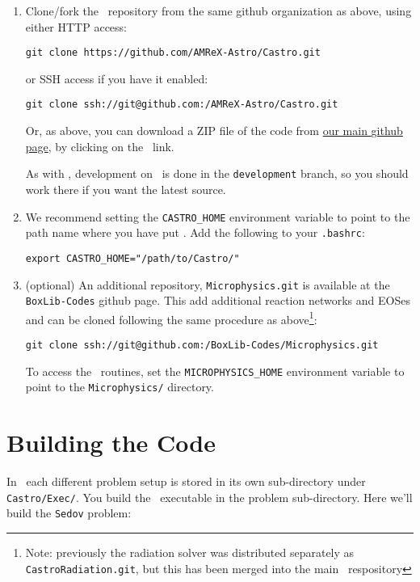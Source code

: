 \begin{enumerate}
\item Clone/fork the \castro\ repository from the same {\sf
  github} organization as above, using either HTTP access:
\begin{verbatim}
git clone https://github.com/AMReX-Astro/Castro.git
\end{verbatim}
or SSH access if you have it enabled:
\begin{verbatim}
git clone ssh://git@github.com:/AMReX-Astro/Castro.git
\end{verbatim}
Or, as above, you can download a ZIP file of the code from
\href{https://github.com/AMReX-Astro}{our main {\sf github} page},
by clicking on the \castro\ link.

As with \amrex, development on \castro\ is done in the
{\tt development} branch, so you should work there if you want
the latest source.

\item We recommend setting the {\tt CASTRO\_HOME} environment
  variable to point to the path name where you have put \castro.
  Add the following to your {\tt .bashrc}:
\begin{verbatim}
export CASTRO_HOME="/path/to/Castro/"
\end{verbatim}


\item (optional) An additional repository, {\tt Microphysics.git} is
  available at the {\tt BoxLib-Codes} github page.  This add
  additional reaction networks and EOSes and can be cloned following
  the same procedure as above\footnote{Note: previously the radiation
    solver was distributed separately as {\tt CastroRadiation.git},
    but this has been merged into the main \castro\ respository}:
\begin{verbatim}
git clone ssh://git@github.com:/BoxLib-Codes/Microphysics.git
\end{verbatim}

To access the \microphysics\ routines, set the {\tt MICROPHYSICS\_HOME}
environment variable to point to the {\tt Microphysics/} directory.

\end{enumerate}


\section{Building the Code}

In \castro\ each different problem setup is stored in its own
sub-directory under {\tt Castro/Exec/}.  You build the
\castro\ executable in the problem sub-directory.  Here we'll
build the {\tt Sedov} problem:


